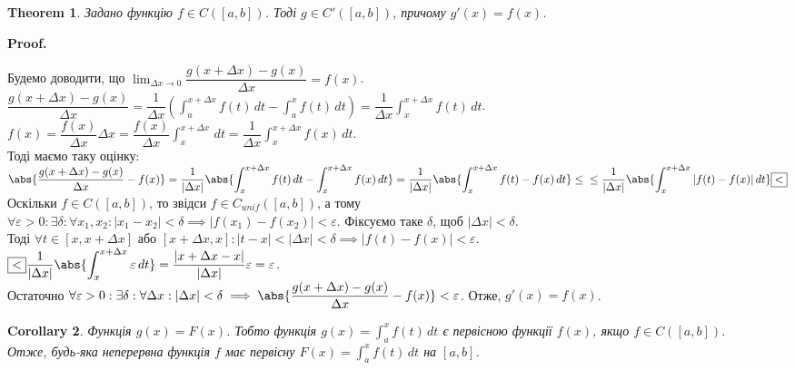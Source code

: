 \documentclass[a4paper, 10pt]{article}
\makeatletter
\def\huge{\displaystyle}
\def\qed{$\blacksquare$}
\theoremstyle{theoremdd}
\newtheorem{theorem}{Theorem}[subsection]
\theoremstyle{theoremdd}
\theoremstyle{theoremdd}
\theoremstyle{theoremdd}
\theoremstyle{theoremdd}
\theoremstyle{theoremdd}
\theoremstyle{theoremdd}
\theoremstyle{theoremdd}
\theoremstyle{theoremdd}
\newtheorem{corollary}[theorem]{Corollary}
\renewenvironment{proof}[1][Proof.\\]{\par
\pushQED{\hfill \qed}%
\normalfont \topsep6\p@\@plus6\p@\relax
\trivlist
\item\relax
{\bfseries
#1\@addpunct{.}}\hspace\labelsep\ignorespaces
}{%
\popQED\endtrivlist\@endpefalse
}
\makeatother
\begin{document}
\begin{theorem}
Задано функцію $f \in C([a,b])$. Тоді $g \in C'([a,b])$, причому $g'(x) = f(x)$.
\end{theorem}

\begin{proof}
Будемо доводити, що $\huge\lim_{\Delta x \to 0} \dfrac{g(x+\Delta x) - g(x)}{\Delta x} = f(x)$.\\
$\dfrac{g(x+\Delta x)-g(x)}{\Delta x} = \dfrac{1}{\Delta x} \huge \left( \int_a^{x+\Delta x} f(t)\,dt - \int_a^x f(t)\,dt \right) = \dfrac{1}{\Delta x} \int_x^{x+\Delta x} f(t)\,dt$.\\
$f(x) = \dfrac{f(x)}{\Delta x} \Delta x = \dfrac{f(x)}{\Delta x} \huge\int_x^{x+\Delta x} \,dt = \dfrac{1}{\Delta x} \int_x^{x+\Delta x} f(x)\,dt$.\\
Тоді маємо таку оцінку:\\
$\huge \abs{\dfrac{g(x+\Delta x) - g(x)}{\Delta x} - f(x)} = \dfrac{1}{|\Delta x|} \abs{\int_x^{x+\Delta x} f(t)\,dt - \int_x^{x+\Delta x} f(x)\,dt} = \dfrac{1}{|\Delta x|} \abs{\int_x^{x+\Delta x} f(t)-f(x)\,dt} \leq \\ \leq \dfrac{1}{|\Delta x|} \abs{\int_x^{x+\Delta x} |f(t)-f(x)|\,dt} \boxed{<}$\\
Оскільки $f \in C([a,b])$, то звідси $f \in C_{unif}([a,b])$, а тому\\
$\forall \varepsilon > 0: \exists \delta: \forall x_1,x_2: |x_1-x_2| < \delta \implies |f(x_1)-f(x_2)| < \varepsilon$.
Фіксуємо таке $\delta$, щоб $|\Delta x| < \delta$.\\
Тоді $\forall t \in [x,x+\Delta x]$ або $[x+\Delta x,x]: |t-x| < |\Delta x| < \delta \implies |f(t)-f(x)| < \varepsilon$.\\
$\boxed{<} \dfrac{1}{|\Delta x|} \huge \abs{\int_x^{x+\Delta x} \varepsilon \,dt} = \dfrac{|x+\Delta x - x|}{|\Delta x|} \varepsilon = \varepsilon$.\\
Остаточно $\forall \varepsilon > 0: \exists \delta: \forall \Delta x: |\Delta x| < \delta \implies \abs{\dfrac{g(x+\Delta x) - g(x)}{\Delta x} - f(x)} < \varepsilon$. Отже, $g'(x) = f(x)$.
\end{proof}

\begin{corollary}
Функція $g(x) = F(x)$. Тобто функція $g(x) = \huge\int_a^x f(t)\,dt$ є первісною функції $f(x)$, якщо $f \in C([a,b])$.\\
Отже, будь-яка неперервна функція $f$ має первісну $F(x) = \huge\int_a^x f(t)\,dt$ на $[a,b]$.
\end{corollary}
\end{document}
